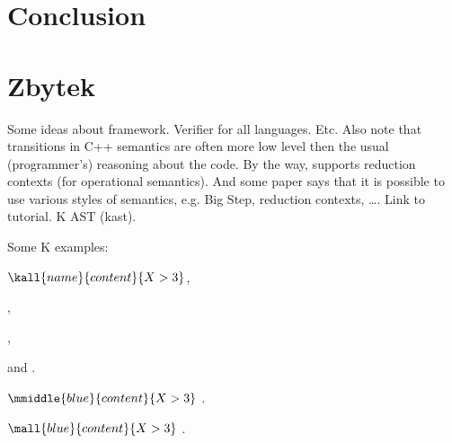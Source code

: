 \documentclass{fithesis3}
\begin{document}





\chapter{Conclusion}
	
\chapter{Zbytek}

Some ideas about \K framework. Verifier for all languages. Etc. Also note that transitions in C++ semantics are often more low level then the usual (programmer's) reasoning about the code. By the way, \K supports reduction contexts (for operational semantics). And some \K paper says that it is possible to use various styles of semantics, e.g. Big Step, reduction contexts, \ldots . Link to \K tutorial. K AST (kast).


\ifshowkexamples
Some K examples:

$\kall{name}{content}{X > 3}$,

,

,

and .

$\mmiddle{blue}{content}{X > 3}$
.

$\mall{blue}{content}{X > 3}$
.


\fi %

\fi %


 
\end{document}
